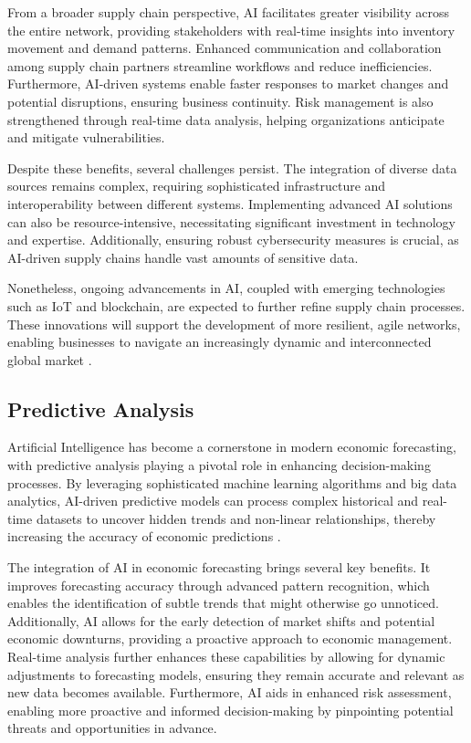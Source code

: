 From a broader supply chain perspective, AI facilitates greater visibility across the entire network, providing stakeholders with real-time insights into inventory movement and demand patterns. Enhanced communication and collaboration among supply chain partners streamline workflows and reduce inefficiencies. Furthermore, AI-driven systems enable faster responses to market changes and potential disruptions, ensuring business continuity. Risk management is also strengthened through real-time data analysis, helping organizations anticipate and mitigate vulnerabilities.

Despite these benefits, several challenges persist. The integration of diverse data sources remains complex, requiring sophisticated infrastructure and interoperability between different systems. Implementing advanced AI solutions can also be resource-intensive, necessitating significant investment in technology and expertise. Additionally, ensuring robust cybersecurity measures is crucial, as AI-driven supply chains handle vast amounts of sensitive data.

Nonetheless, ongoing advancements in AI, coupled with emerging technologies such as IoT and blockchain, are expected to further refine supply chain processes. These innovations will support the development of more resilient, agile networks, enabling businesses to navigate an increasingly dynamic and interconnected global market \cite{IBM-AI-Supply-Chain}.


\subsection{Predictive Analysis}
\label{subsec:predictive-analysis}

Artificial Intelligence has become a cornerstone in modern economic forecasting, with predictive analysis playing a pivotal role in enhancing decision-making processes. 
By leveraging sophisticated machine learning algorithms and big data analytics, AI-driven predictive models can process complex historical and real-time datasets to 
uncover hidden trends and non-linear relationships, thereby increasing the accuracy of economic predictions \cite{Predictive-Analysis-ai}. 

The integration of AI in economic forecasting brings several key benefits. It improves forecasting accuracy through advanced pattern recognition, 
which enables the identification of subtle trends that might otherwise go unnoticed. Additionally, AI allows for the early detection of market shifts 
and potential economic downturns, providing a proactive approach to economic management. Real-time analysis further enhances these capabilities by 
allowing for dynamic adjustments to forecasting models, ensuring they remain accurate and relevant as new data becomes available. Furthermore, 
AI aids in enhanced risk assessment, enabling more proactive and informed decision-making by pinpointing potential threats and opportunities in advance.

